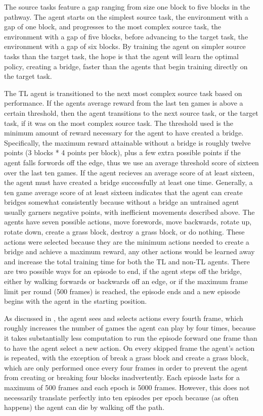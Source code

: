 \documentclass{llncs}
\begin{document}
The source tasks feature a gap ranging from size one block to five blocks in the pathway. 
The agent starts on the simplest source task, the environment with a gap of one block, and progresses to the most complex source task, the environment with a gap of five blocks, before advancing to the target task, the environment with a gap of six blocks.
By training the agent on simpler source tasks than the target task, the hope is that the agent will learn the optimal policy, creating a bridge, faster than the agents that begin training directly on the target task. 

The TL agent is transitioned to the next most complex source task based on performance.
If the agents average reward from the last ten games is above a certain threshold, then the agent transitions to the next source task, or the target task, if it was on the most complex source task.
The threshold used is the minimum amount of reward necessary for the agent to have created a bridge. 
Specifically, the maximum reward attainable without a bridge is roughly twelve points (3 blocks * 4 points per block), plus a few extra possible points if the agent falls forwords off the edge, thus we use an average threshold score of sixteen over the last ten games.
If the agent recieves an average score of at least sixteen, the agent must have created a bridge successfully at least one time. 
Generally, a ten game average score of at least sixteen indicates that the agent can create bridges somewhat consistently because without a bridge an untrained agent usually garners negative points, with inefficient movements described above. 
The agents have seven possible actions, move forewords, move backwards, rotate up, rotate down, create a grass block, destroy a grass block, or do nothing. 
These actions were selected because they are the minimum actions needed to create a bridge and achieve a maximum reward, any other actions would be learned away and increase the total training time for both the TL and non-TL agents. 
There are two possible ways for an episode to end, if the agent steps off the bridge, either by walking forwards or backwards off an edge, or if the maximum frame limit per round (500 frames) is reached, the episode ends and a new episode begins with the agent in the starting position. 

As discussed in \citep{mnih2015human}, the agent sees and selects actions every fourth frame, which roughly increases the number of games the agent can play by four times, because it takes substantially less computation to run the episode forward one frame than to have the agent select a new action. 
On every skipped frame the agent's action is repeated, with the exception of break a grass block and create a grass block, which are only performed once every four frames in order to prevent the agent from creating or breaking four blocks inadvertently. 
Each episode lasts for a maximum of 500 frames and each epoch is 5000 frames. 
However, this does not necessarily translate perfectly into ten episodes per epoch because (as often happens) the agent can die by walking off the path.
\end{document}
